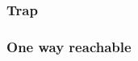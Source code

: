 \documentclass[aspectratio=169]{beamer}
\begin{document}
\begin{frame}
\frametitle{Trap}
\begin{figure}[ht]\centering
{}
\end{figure}
\end{frame}

\begin{frame}
\frametitle{One way reachable}
\begin{figure}[ht]\centering
{}
\end{figure}
\end{frame}
\end{document}
